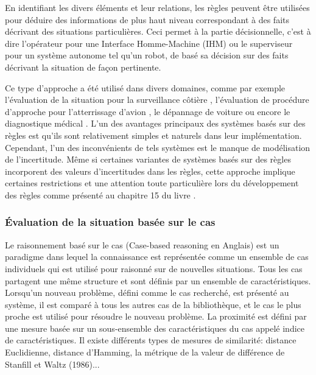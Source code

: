\documentclass[a4paper,11pt,twoside]{StyleThese}
\begin{document}
En identifiant les divers éléments et leur relations, les règles peuvent être utilisées pour déduire des informations de plus haut niveau correspondant à des faits décrivant des situations particulières. Ceci permet à la partie décisionnelle, c'est à dire l'opérateur pour une Interface Homme-Machine (IHM) ou le superviseur pour un système autonome tel qu'un robot, de basé sa décision sur des faits décrivant la situation de façon pertinente.

Ce type d'approche a été utilisé dans divers domaines, comme par exemple l'évaluation de la situation pour la surveillance côtière \cite{edlund2006rule}, l'évaluation de procédure d'approche pour l'atterrissage d'avion \cite{baron1980procru,milgram1984multi}, le dépannage de voiture ou encore le diagnostique médical \cite{swartout1985rule,miller1982internist}.
L'un des avantages principaux des systèmes basés sur des règles est qu'ils sont relativement simples et naturels dans leur implémentation.
Cependant, l'un des inconvénients de tels systèmes est le manque de modélisation de l'incertitude.
Même si certaines variantes de systèmes basés sur des règles incorporent des valeurs d'incertitudes dans les règles, cette approche implique certaines restrictions et une attention toute particulière lors du développement des règles comme présenté au chapitre 15 du livre \cite{russell2003artificial}.


\subsubsection{Évaluation de la situation basée sur le cas}

Le raisonnement basé sur le cas (Case-based reasoning en Anglais) est un paradigme dans lequel la connaissance est représentée comme un ensemble de cas individuels qui est utilisé pour raisonné sur de nouvelles situations. Tous les cas partagent une même structure et sont définis par un ensemble de caractéristiques. Lorsqu'un nouveau problème, défini comme le cas recherché, est présenté au système, il est comparé à tous les autres cas de la bibliothèque, et le cas le plus proche est utilisé pour résoudre le nouveau problème. La proximité est défini par une mesure basée sur un sous-ensemble des caractéristiques du cas appelé indice de caractéristiques. Il existe différents types de mesures de similarité: distance Euclidienne, distance d'Hamming, la métrique de la valeur de différence de Stanfill et Waltz (1986)...
\end{document}
